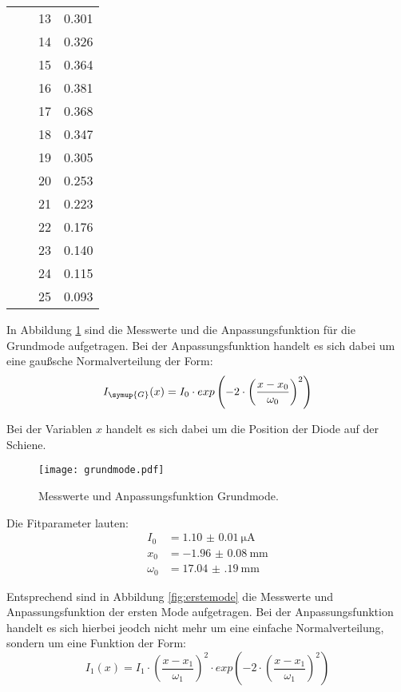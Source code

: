 \begin{table}[H]
\begin{tabular}{S S S S}
       &       &    13  & 0.301 \\
       &       &    14  & 0.326 \\
       &       &    15  & 0.364 \\
       &       &    16  & 0.381 \\
       &       &    17  & 0.368 \\
       &       &    18  & 0.347 \\
       &       &    19  & 0.305 \\
       &       &    20  & 0.253 \\
       &       &    21  & 0.223 \\
       &       &    22  & 0.176 \\
       &       &    23  & 0.140 \\
       &       &    24  & 0.115 \\
       &       &    25  & 0.093 \\
    \bottomrule
  \end{tabular}
\end{table}

In Abbildung \ref{fig:grundmode} sind die Messwerte und die Anpassungsfunktion
für die Grundmode aufgetragen. Bei der Anpassungsfunktion handelt es sich dabei
um eine gaußsche Normalverteilung der Form:
\begin{equation*}
  I_\symup{G}(x) = I_0 \cdot exp\left(-2 \cdot \left(\frac{x - x_0}{\omega_0}\right)^2\right)
\end{equation*}

Bei der Variablen $x$ handelt es sich dabei um die Position der Diode auf der Schiene.

\begin{figure}[H]
  \centering
  \texttt{[image: grundmode.pdf]}
  \caption{Messwerte und Anpassungsfunktion Grundmode.}
  \label{fig:grundmode}
\end{figure}

Die Fitparameter lauten:
\begin{align*}
  I_0 &= \SI{1.10(1)}{\micro\ampere} \\
  x_0 &= \SI{-1.96(8)}{\milli\meter} \\
  \omega_0 &= \SI{17.04(19)}{\milli\meter}
\end{align*}

Entsprechend sind in Abbildung \ref{fig:erstemode} die Messwerte und Anpassungsfunktion
der ersten Mode aufgetragen. Bei der Anpassungsfunktion handelt es sich hierbei jeodch
nicht mehr um eine einfache Normalverteilung, sondern um eine Funktion der Form:
\begin{equation*}
  I_{1}(x) = I_1 \cdot \left(\frac{x - x_1}{\omega_1}\right)^2 \cdot exp\left(-2 \cdot \left(\frac{x - x_1}{\omega_1}\right)^2\right)
\end{equation*}

